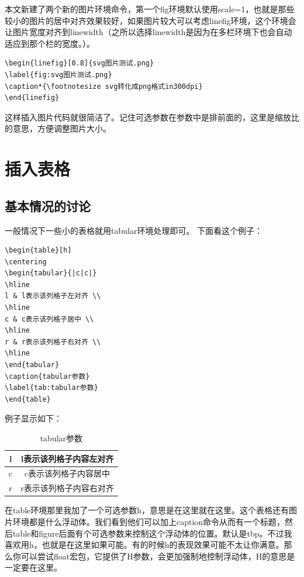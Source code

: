 \documentclass[11pt,oneside]{book}
\begin{document}
本文新建了两个新的图片环境命令，第一个fig环境默认使用scale=1，也就是那些较小的图片的居中对齐效果较好，如果图片较大可以考虑linefig环境，这个环境会让图片宽度对齐到linewidth（之所以选择linewidth是因为在多栏环境下也会自动适应到那个栏的宽度。）。

\begin{Verbatim}
\begin{linefig}[0.8]{svg图片测试.png}
\label{fig:svg图片测试.png}
\caption*{\footnotesize svg转化成png格式in300dpi}
\end{linefig}
\end{Verbatim}
这样插入图片代码就很简洁了。记住可选参数在参数中是排前面的，这里是缩放比的意思，方便调整图片大小。







\chapter{插入表格}
\section{基本情况的讨论}
一般情况下一些小的表格就用tabular环境处理即可。
下面看这个例子：
\begin{Verbatim}
\begin{table}[h]
\centering
\begin{tabular}{|c|c|}
\hline
l & l表示该列格子左对齐 \\
\hline
c & c表示该列格子居中 \\
\hline
r & r表示该列格子右对齐 \\
\hline
\end{tabular}
\caption{tabular参数}
\label{tab:tabular参数}
\end{table}
\end{Verbatim}

例子显示如下：
\begin{table}[H]
\centering
\begin{tabular}{|c|c|}
\hline 
l & l表示该列格子内容左对齐 \\
\hline
c & c表示该列格子内容居中 \\  
\hline
r & r表示该列格子内容右对齐 \\ 
\hline
\end{tabular}
\caption{tabular参数}
\label{tab:tabular参数}
\end{table}
在table环境那里我加了一个可选参数h，意思是在这里就在这里。这个表格还有图片环境都是什么浮动体。我们看到他们可以加上caption命令从而有一个标题，然后table和figure后面有个可选参数来控制这个浮动体的位置。默认是tbp。不过我喜欢用h，也就是在这里如果可能。有的时候h的表现效果可能不太让你满意。那么你可以尝试float宏包，它提供了H参数，会更加强制地控制浮动体，H的意思是一定要在这里。
\end{document}

